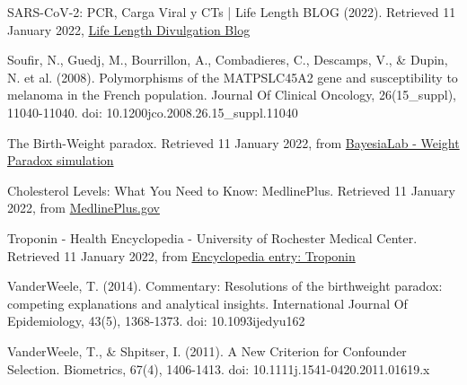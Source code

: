 \documentclass{article}
\begin{document}
SARS-CoV-2: PCR, Carga Viral y CTs | Life Length BLOG (2022). Retrieved 11 January 2022, \href{from https://lifelength.com/es/sars-cov-2-pcr-carga-viral-y-cts/}{Life Length Divulgation Blog}

Soufir, N., Guedj, M., Bourrillon, A., Combadieres, C., Descamps, V., \& Dupin, N. et al. (2008). Polymorphisms of the MATP\/SLC45A2 gene and susceptibility to melanoma in the French population. Journal Of Clinical Oncology, 26(15\_suppl), 11040-11040. doi: 10.1200\/jco.2008.26.15\_suppl.11040

The Birth-Weight paradox. Retrieved 11 January 2022, from \href{https://library.bayesia.com/articles/#!bayesialab-knowledge-hub/the-birth-weight-paradox}{BayesiaLab - Weight Paradox simulation}

Cholesterol Levels: What You Need to Know: MedlinePlus. Retrieved 11 January 2022, from \href{https://medlineplus.gov/cholesterollevelswhatyouneedtoknow.html}{MedlinePlus.gov}

Troponin - Health Encyclopedia - University of Rochester Medical Center. Retrieved 11 January 2022, from \href{https://www.urmc.rochester.edu/encyclopedia/content.aspx?contenttypeid=167&contentid=troponin}{Encyclopedia entry: Troponin}

VanderWeele, T. (2014). Commentary: Resolutions of the birthweight paradox: competing explanations and analytical insights. International Journal Of Epidemiology, 43(5), 1368-1373. doi: 10.1093\/ije\/dyu162

VanderWeele, T., \& Shpitser, I. (2011). A New Criterion for Confounder Selection. Biometrics, 67(4), 1406-1413. doi: 10.1111\/j.1541-0420.2011.01619.x
\end{document}
